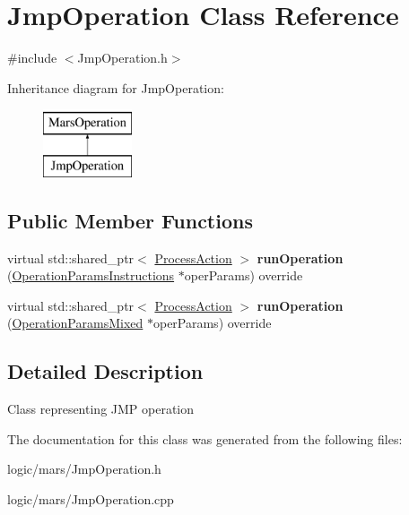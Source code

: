 \hypertarget{classJmpOperation}{}\section{Jmp\+Operation Class Reference}
\label{classJmpOperation}


{\ttfamily \#include $<$Jmp\+Operation.\+h$>$}

Inheritance diagram for Jmp\+Operation\+:\begin{figure}[H]
\begin{center}
\leavevmode
\includegraphics[height=2.000000cm]{classJmpOperation}
\end{center}
\end{figure}
\subsection*{Public Member Functions}
\begin{DoxyCompactItemize}
\item 
\mbox{\label{classJmpOperation_a849c86f28f7fc091b7a9f46e968fd811}} 
virtual std\+::shared\+\_\+ptr$<$ \hyperlink{classProcessAction}{Process\+Action} $>$ {\bfseries run\+Operation} (\hyperlink{classOperationParamsInstructions}{Operation\+Params\+Instructions} $\ast$oper\+Params) override
\item 
\mbox{\label{classJmpOperation_aeb6441bfb981138d289ee715900b2b9f}} 
virtual std\+::shared\+\_\+ptr$<$ \hyperlink{classProcessAction}{Process\+Action} $>$ {\bfseries run\+Operation} (\hyperlink{classOperationParamsMixed}{Operation\+Params\+Mixed} $\ast$oper\+Params) override
\end{DoxyCompactItemize}


\subsection{Detailed Description}
Class representing J\+MP operation 

The documentation for this class was generated from the following files\+:\begin{DoxyCompactItemize}
\item 
logic/mars/Jmp\+Operation.\+h\item 
logic/mars/Jmp\+Operation.\+cpp\end{DoxyCompactItemize}
